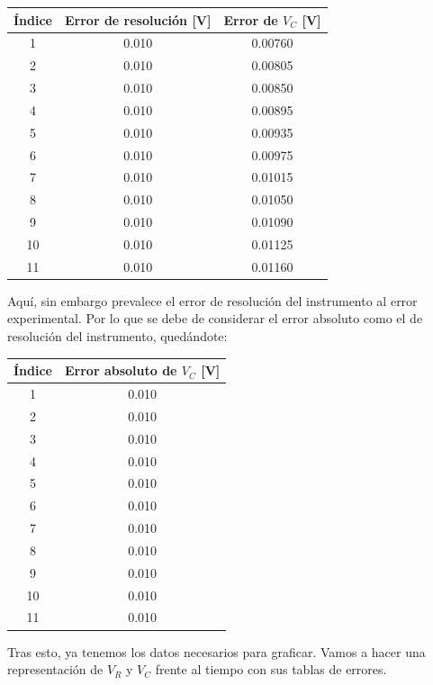 \documentclass{article}
\begin{document}
\vspace{2em}
 \begin{table}[H]
 	\centering
 	\begin{tabular}{|c|c|c|}
 		\hline
 		\textbf{Índice} & \textbf{Error de resolución [V]} & \textbf{Error de $V_C$ [V]} \\
 		\hline
 		1  & 0.010 & 0.00760 \\
 		2  & 0.010 & 0.00805 \\
 		3  & 0.010 & 0.00850 \\
 		4  & 0.010 & 0.00895 \\
 		5  & 0.010 & 0.00935 \\
 		6  & 0.010 & 0.00975 \\
 		7  & 0.010 & 0.01015 \\
 		8  & 0.010 & 0.01050 \\
 		9  & 0.010 & 0.01090 \\
 		10 & 0.010 & 0.01125 \\
 		11 & 0.010 & 0.01160 \\
 		\hline
 	\end{tabular}
 \end{table}
 Aquí, sin embargo prevalece el error de resolución del instrumento al error experimental. Por lo que se debe de considerar el error absoluto como el de resolución del instrumento, quedándote:
 \begin{table}[H]
 	\centering
 	\begin{tabular}{|c|c|}
 		\hline
 		\textbf{Índice} & \textbf{Error absoluto de $V_C$ [V]} \\
 		\hline
 		1  & 0.010 \\
 		2  & 0.010 \\
 		3  & 0.010 \\
 		4  & 0.010 \\
 		5  & 0.010 \\
 		6  & 0.010 \\
 		7  & 0.010 \\
 		8  & 0.010 \\
 		9  & 0.010 \\
 		10 & 0.010 \\
 		11 & 0.010 \\
 		\hline
 	\end{tabular}
 \end{table}
 Tras esto, ya tenemos los datos necesarios para graficar. Vamos a hacer una representación de $V_R$ y $V_C$ frente al tiempo con sus tablas de errores.
\end{document}

